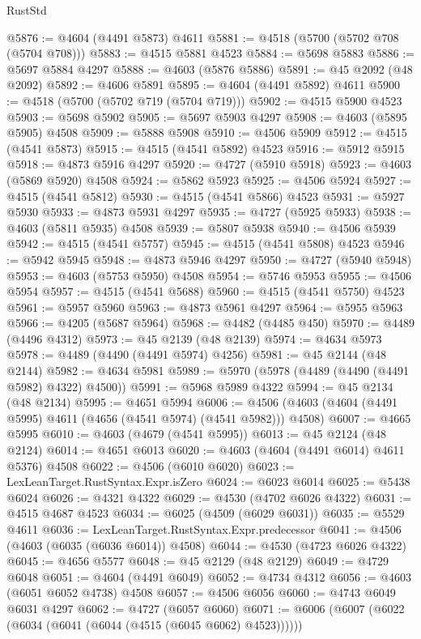 \begin{lexlean}{RustStd}
\begin{coremodule}
@5876 := @4604 (@4491 @5873) @4611
@5881 := @4518 (@5700 (@5702 @708 (@5704 @708)))
@5883 := @4515 @5881 @4523
@5884 := @5698 @5883
@5886 := @5697 @5884 @4297
@5888 := @4603 (@5876 @5886)
@5891 := @45 @2092 (@48 @2092)
@5892 := @4606 @5891
@5895 := @4604 (@4491 @5892) @4611
@5900 := @4518 (@5700 (@5702 @719 (@5704 @719)))
@5902 := @4515 @5900 @4523
@5903 := @5698 @5902
@5905 := @5697 @5903 @4297
@5908 := @4603 (@5895 @5905) @4508
@5909 := @5888 @5908
@5910 := @4506 @5909
@5912 := @4515 (@4541 @5873)
@5915 := @4515 (@4541 @5892) @4523
@5916 := @5912 @5915
@5918 := @4873 @5916 @4297
@5920 := @4727 (@5910 @5918)
@5923 := @4603 (@5869 @5920) @4508
@5924 := @5862 @5923
@5925 := @4506 @5924
@5927 := @4515 (@4541 @5812)
@5930 := @4515 (@4541 @5866) @4523
@5931 := @5927 @5930
@5933 := @4873 @5931 @4297
@5935 := @4727 (@5925 @5933)
@5938 := @4603 (@5811 @5935) @4508
@5939 := @5807 @5938
@5940 := @4506 @5939
@5942 := @4515 (@4541 @5757)
@5945 := @4515 (@4541 @5808) @4523
@5946 := @5942 @5945
@5948 := @4873 @5946 @4297
@5950 := @4727 (@5940 @5948)
@5953 := @4603 (@5753 @5950) @4508
@5954 := @5746 @5953
@5955 := @4506 @5954
@5957 := @4515 (@4541 @5688)
@5960 := @4515 (@4541 @5750) @4523
@5961 := @5957 @5960
@5963 := @4873 @5961 @4297
@5964 := @5955 @5963
@5966 := @4205 (@5687 @5964)
@5968 := @4482 (@4485 @450)
@5970 := @4489 (@4496 @4312)
@5973 := @45 @2139 (@48 @2139)
@5974 := @4634 @5973
@5978 := @4489 (@4490 (@4491 @5974) @4256)
@5981 := @45 @2144 (@48 @2144)
@5982 := @4634 @5981
@5989 := @5970 (@5978 (@4489 (@4490 (@4491 @5982) @4322) @4500))
@5991 := @5968 @5989 @4322
@5994 := @45 @2134 (@48 @2134)
@5995 := @4651 @5994
@6006 := @4506 (@4603 (@4604 (@4491 @5995) @4611 (@4656 (@4541 @5974) (@4541 @5982))) @4508)
@6007 := @4665 @5995
@6010 := @4603 (@4679 (@4541 @5995))
@6013 := @45 @2124 (@48 @2124)
@6014 := @4651 @6013
@6020 := @4603 (@4604 (@4491 @6014) @4611 @5376) @4508
@6022 := @4506 (@6010 @6020)
@6023 := LexLeanTarget.RustSyntax.Expr.isZero
@6024 := @6023 @6014
@6025 := @5438 @6024
@6026 := @4321 @4322
@6029 := @4530 (@4702 @6026 @4322)
@6031 := @4515 @4687 @4523
@6034 := @6025 (@4509 (@6029 @6031))
@6035 := @5529 @4611
@6036 := LexLeanTarget.RustSyntax.Expr.predecessor
@6041 := @4506 (@4603 (@6035 (@6036 @6014)) @4508)
@6044 := @4530 (@4723 @6026 @4322)
@6045 := @4656 @5577
@6048 := @45 @2129 (@48 @2129)
@6049 := @4729 @6048
@6051 := @4604 (@4491 @6049)
@6052 := @4734 @4312
@6056 := @4603 (@6051 @6052 @4738) @4508
@6057 := @4506 @6056
@6060 := @4743 @6049 @6031 @4297
@6062 := @4727 (@6057 @6060)
@6071 := @6006 (@6007 (@6022 (@6034 (@6041 (@6044 (@4515 (@6045 @6062) @4523))))))

\end{coremodule}
\end{lexlean}
